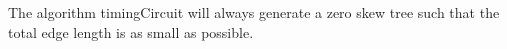 \documentclass[11pt]{scrartcl}
\begin{document}
\iffalse
\begin{lemma}
	If $L_\alpha = L_\phi$ and $R_\alpha = R_\phi$,	then $\ell^\alpha_{(v,l)} \leq \ell^\phi_{(v,l)}$ and 
	$\ell^\alpha_{(v,r)} \leq \ell^\phi_{(v,r)}$.
\end{lemma}
\begin{proof}
	Consider the case when $\delta_l + \ell_{(v,l)} > \delta_r + \ell_{(v,r)}$.
	We show $\ell^\alpha_{(v,l)} \leq \ell^\phi_{(v,l)}$ and 
	$\ell^\alpha_{(v,r)} \leq \ell^\phi_{(v,r)}$.
	Suppose for the sake of contradiction, $\ell^\alpha_{(v,l)} > \ell^\phi_{(v,l)}$.

\end{proof}
\fi
\begin{theorem}
	The algorithm timingCircuit will always generate a zero skew tree such that the 
	total edge length is as small as possible.
\end{theorem}
\end{document}
